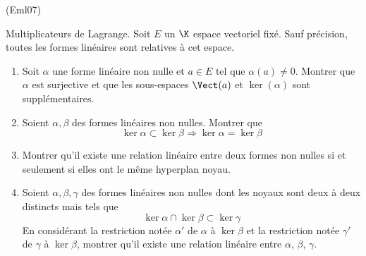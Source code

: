 \begin{tiny}(Eml07)\end{tiny}
Multiplicateurs de Lagrange.\newline
Soit $E$ un $\K$ espace vectoriel fixé. Sauf précision, toutes les formes linéaires sont relatives à cet espace. 
\begin{enumerate}
  \item Soit $\alpha$ une forme linéaire non nulle et $a\in E$ tel que $\alpha(a)\neq 0$. Montrer que $\alpha$ est surjective et que les sous-espaces $\Vect(a)$ et $\ker(\alpha)$ sont supplémentaires.
  \item Soient $\alpha, \beta$ des formes lin{\'e}aires non nulles.
Montrer que 
\begin{displaymath}
 \ker\alpha\subset\ker \beta \Rightarrow \ker\alpha = \ker \beta
\end{displaymath}
\item Montrer qu'il existe une relation lin{\'e}aire entre deux formes non nulles si et seulement si elles ont le m{\^e}me hyperplan noyau.
 \item Soient $\alpha , \beta , \gamma $ des formes lin{\'e}aires non nulles dont les noyaux sont deux {\`a} deux distincts mais tels que $$\ker \alpha \cap \ker \beta \subset \ker \gamma$$
En consid{\'e}rant la restriction not{\'e}e $\alpha'$ de $\alpha$ {\`a} $\ker \beta$ et la restriction not{\'e}e $\gamma'$ de $\gamma$ {\`a} $\ker \beta$, montrer qu'il existe une relation lin{\'e}aire entre $\alpha$, $\beta$, $\gamma$.
\end{enumerate}